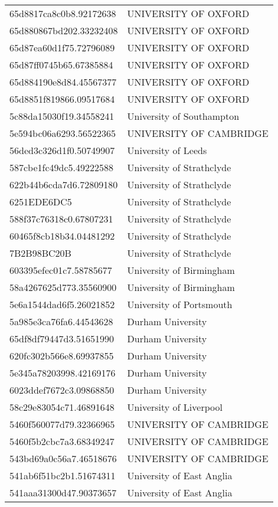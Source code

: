 \begin{tabular}{ll}
65d8817ca8c0b8.92172638 & UNIVERSITY OF OXFORD \\
65d880867bd202.33232408 & UNIVERSITY OF OXFORD \\
65d87ea60d1f75.72796089 & UNIVERSITY OF OXFORD \\
65d87ff0745b65.67385884 & UNIVERSITY OF OXFORD \\
65d884190e8d84.45567377 & UNIVERSITY OF OXFORD \\
65d8851f819866.09517684 & UNIVERSITY OF OXFORD \\
5c88da15030f19.34558241 & University of Southampton \\
5e594bc06a6293.56522365 & UNIVERSITY OF CAMBRIDGE \\
56ded3c326d1f0.50749907 & University of Leeds \\
587cbe1fc49dc5.49222588 & University of Strathclyde \\
622b44b6cda7d6.72809180 & University of Strathclyde \\
6251EDE6DC5 & University of Strathclyde \\
588f37c76318c0.67807231 & University of Strathclyde \\
60465f8cb18b34.04481292 & University of Strathclyde \\
7B2B98BC20B & University of Strathclyde \\
603395efec01c7.58785677 & University of Birmingham \\
58a4267625d773.35560900 & University of Birmingham \\
5e6a1544dad6f5.26021852 & University of Portsmouth \\
5a985e3ca76fa6.44543628 & Durham University \\
65df8df79447d3.51651990 & Durham University \\
620fc302b566e8.69937855 & Durham University \\
5e345a78203998.42169176 & Durham University \\
6023ddef7672c3.09868850 & Durham University \\
58c29e83054c71.46891648 & University of Liverpool \\
5460f560077d79.32366965 & UNIVERSITY OF CAMBRIDGE \\
5460f5b2cbc7a3.68349247 & UNIVERSITY OF CAMBRIDGE \\
543bd69a0c56a7.46518676 & UNIVERSITY OF CAMBRIDGE \\
541ab6f51bc2b1.51674311 & University of East Anglia \\
541aaa31300d47.90373657 & University of East Anglia \\

\end{tabular}

